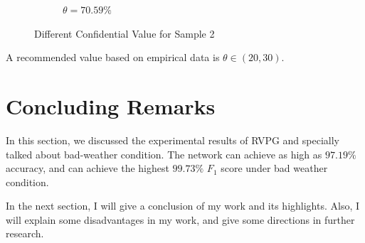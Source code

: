 \begin{spacing}{1.5}
\begin{figure}[!ht]
\begin{subfigure}[b]{0.49\textwidth}
        \caption{$\theta = 70.59\%$}
    \end{subfigure}
    \caption{Different Confidential Value for Sample 2}
    \label{fig:threshold2}
\end{figure}

A recommended value based on empirical data is $\theta \in (20,30)$.

\section{Concluding Remarks}

In this section, we discussed the experimental results of RVPG and specially talked about bad-weather condition. The network can achieve as high as $97.19\%$ accuracy, and can achieve the highest $99.73\%$ $F_1$ score under bad weather condition.

In the next section, I will give a conclusion of my work and its highlights. Also, I will explain some disadvantages in my work, and give some directions in further research.

\end{spacing}
\newpage
